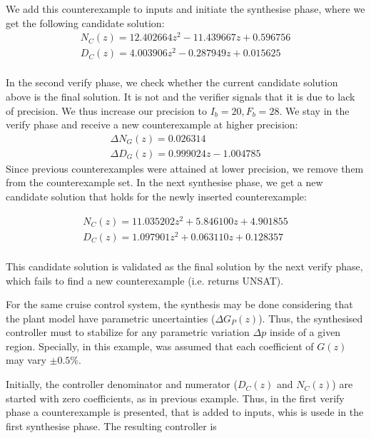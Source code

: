 \documentclass{sig-alternate-05-2015}
\newcommand{\blue}[1]{{\color{blue}#1}}
\newcommand{\red}[1]{{\color{red}#1}}
\begin{document}
We add this counterexample to {\sc inputs} and initiate the {\sc synthesise} phase, where we get the following candidate solution: 
$$
\begin{array}{ll}
N_C(z) {=} 12.402664z^2{-}11.439667z{+}0.596756\\
D_C(z) {=} 4.003906z^2{-}0.287949z{+}0.015625\\
\end{array}
$$

In the second {\sc verify} phase, we check whether the current candidate
solution above is the final solution. It is not and the verifier signals
that it is due to lack of precision. We thus increase our precision to
$I_b=20,F_b=28$.
%
We stay in the {\sc verify} phase and receive a new counterexample at
higher precision:
%
$$
\begin{array}{ll}
\Delta N_G(z) {=} 0.026314\\
\Delta D_G(z) {=} 0.999024z{-}1.004785
\end{array}
$$
Since previous counterexamples were attained at lower precision, we 
remove them from the counterexample set. In the next {\sc synthesise}
phase, we get a new candidate solution that holds for the newly
inserted counterexample:

$$
\begin{array}{ll}
N_C(z) {=} 11.035202z^2{+}5.846100z{+}4.901855\\
D_C(z) {=} 1.097901z^2{+}0.063110z{+}0.128357\\
\end{array}
$$

This candidate solution is validated as the final solution by the next 
{\sc verify} phase, which fails to find a new counterexample (i.e. returns UNSAT).

\blue{
For the same cruise control system, the synthesis may be done considering that the plant model have parametric uncertainties ($\Delta G_{P}(z)$). Thus, the synthesised controller must to stabilize for any parametric variation $\Delta p$ inside of a given region. Specially, in this example, was assumed that each coefficient of $G(z)$ may vary $\pm 0.5\%$.
}

\blue{Initially, the controller denominator and numerator  ($D_{C}(z)$ and $N_{C}(z)$) are started with zero coefficients, as in previous example. Thus,  in the first {\sc verify} phase a counterexample is presented, that is added to {\sc inputs}, whis is usede in the first  {\sc synthesise} phase. The resulting controller is
}
\end{document}

